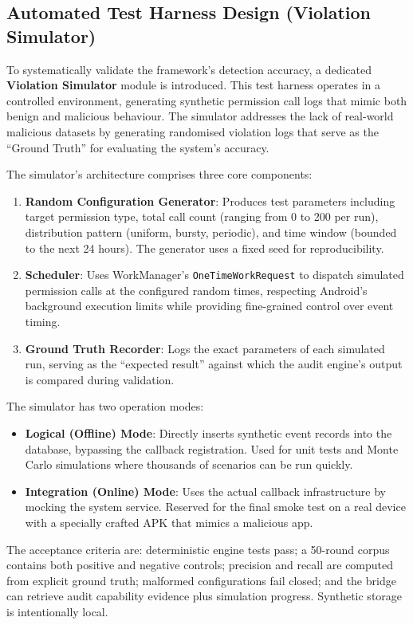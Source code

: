 \subsection{Automated Test Harness Design (Violation Simulator)}

To systematically validate the framework's detection accuracy, a dedicated \textbf{Violation Simulator} module is introduced. This test harness operates in a controlled environment, generating synthetic permission call logs that mimic both benign and malicious behaviour. The simulator addresses the lack of real-world malicious datasets by generating randomised violation logs that serve as the ``Ground Truth'' for evaluating the system's accuracy.

The simulator's architecture comprises three core components:
\begin{enumerate}
\item \textbf{Random Configuration Generator}: Produces test parameters including target permission type, total call count (ranging from 0 to 200 per run), distribution pattern (uniform, bursty, periodic), and time window (bounded to the next 24 hours). The generator uses a fixed seed for reproducibility.
\item \textbf{Scheduler}: Uses WorkManager's \texttt{OneTimeWorkRequest} to dispatch simulated permission calls at the configured random times, respecting Android's background execution limits while providing fine-grained control over event timing.
\item \textbf{Ground Truth Recorder}: Logs the exact parameters of each simulated run, serving as the ``expected result'' against which the audit engine's output is compared during validation.
\end{enumerate}

The simulator has two operation modes:
\begin{itemize}
\item \textbf{Logical (Offline) Mode}: Directly inserts synthetic event records into the database, bypassing the callback registration. Used for unit tests and Monte Carlo simulations where thousands of scenarios can be run quickly.
\item \textbf{Integration (Online) Mode}: Uses the actual callback infrastructure by mocking the system service. Reserved for the final smoke test on a real device with a specially crafted APK that mimics a malicious app.
\end{itemize}

The acceptance criteria are: deterministic engine tests pass; a 50-round corpus contains both positive and negative controls; precision and recall are computed from explicit ground truth; malformed configurations fail closed; and the bridge can retrieve audit capability evidence plus simulation progress. Synthetic storage is intentionally local.


